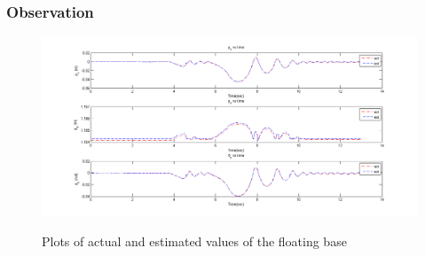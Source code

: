 \subsubsection{Observation}
\begin{figure}
    \centering
    \includegraphics[trim=30mm 0mm 20mm 0mm,clip,scale=0.5]{Bilder/plots/toro/toro_pos.png}
    \label{fig:toro_pos}
    \caption{Plots of actual and estimated values of the floating base}
\end{figure}

